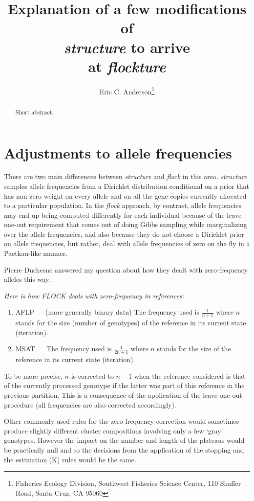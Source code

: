 \documentclass[11pt]{article}
\title{Explanation of a few modifications of\\
{\em structure} to arrive \\
 at {\em flockture}}
\author{Eric C. Anderson\thanks{
    Fisheries Ecology Division, 
    Southwest Fisheries Science Center, 
    110 Shaffer Road,
    Santa Cruz, CA 95060}
}
\begin{document}
\maketitle

\begin{abstract}
Short abstract.
\end{abstract}




\section{Adjustments to allele frequencies}

There are two main differences between {\em structure} and {\em flock} in this area.
{\em structure} samples allele frequencies from a  Dirichlet distribution conditional on a prior that has non-zero weight on every allele and 
on all the gene copies currently allocated to a particular population.  In the {\em flock} approach, by contrast, 
allele frequencies may end up being computed differently for each individual because of the leave-one-out requirement
that comes out of doing Gibbs sampling while marginalizing over the allele frequencies, and also because they do not 
choose a Dirichlet prior on allele frequencies, but rather, deal with allele frequencies of zero on the fly
in a Paetkau-like manner.

Pierre Duchesne answered my question about how they dealt with zero-frequency alleles this way:

{\sl 
Here is how FLOCK deals with zero-frequency in references:
\begin{enumerate}
\item AFLP ~~ (more generally binary data) The frequency used is $\frac{1}{n+1}$ where $n$ stands for  the size (number of genotypes) of the reference in its current state (iteration).
\item MSAT ~~ The frequency used is $\frac{1}{2n+1}$ where $n$ stands for  the size of the reference in its current state (iteration).
\end{enumerate}
To be more precise, $n$ is corrected to $n-1$ when the reference considered is that of the currently processed
genotype if the latter was part of this reference in the previous partition.
This is a consequence of the application of the leave-one-out procedure 
(all frequencies are also corrected accordingly).
 
Other commonly used rules for the zero-frequency correction would sometimes produce slightly
different cluster compositions involving only a few `gray' genotypes.
However the impact on the number and length of the plateaus would be practically null
and so the decisions from the application of the stopping and the estimation (K)
rules would be the same.
}
\end{document}

